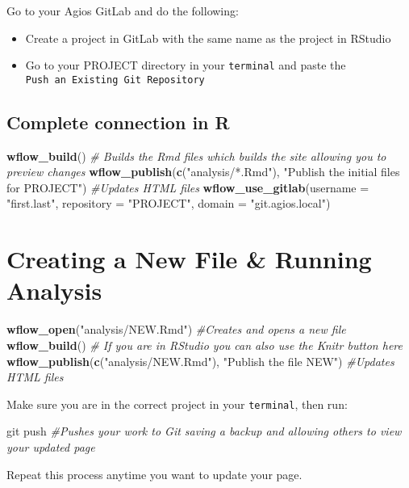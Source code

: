\documentclass[openany]{article}
\newenvironment{Shaded}{\begin{snugshade}}{\end{snugshade}}
\newcommand{\CommentTok}[1]{\textcolor[rgb]{0.56,0.35,0.01}{\textit{#1}}}
\newcommand{\DataTypeTok}[1]{\textcolor[rgb]{0.13,0.29,0.53}{#1}}
\newcommand{\KeywordTok}[1]{\textcolor[rgb]{0.13,0.29,0.53}{\textbf{#1}}}
\newcommand{\NormalTok}[1]{#1}
\newcommand{\StringTok}[1]{\textcolor[rgb]{0.31,0.60,0.02}{#1}}
\providecommand{\tightlist}{%
  \setlength{\itemsep}{0pt}\setlength{\parskip}{0pt}}
\begin{document}
Go to your Agios GitLab and do the following:

\begin{itemize}
\tightlist
\item
  Create a project in GitLab with the same name as the project in RStudio
\item
  Go to your PROJECT directory in your \texttt{terminal} and paste the \texttt{Push\ an\ Existing\ Git\ Repository}
\end{itemize}

\hypertarget{complete-connection-in-r}{%
\subsection{Complete connection in R}\label{complete-connection-in-r}}

\begin{Shaded}
\begin{Highlighting}[]
\KeywordTok{wflow_build}\NormalTok{() }\CommentTok{# Builds the Rmd files which builds the site allowing you to preview changes}
\KeywordTok{wflow_publish}\NormalTok{(}\KeywordTok{c}\NormalTok{(}\StringTok{"analysis/*.Rmd"}\NormalTok{), }\StringTok{"Publish the initial files for PROJECT"}\NormalTok{) }\CommentTok{#Updates HTML files}
\KeywordTok{wflow_use_gitlab}\NormalTok{(}\DataTypeTok{username =} \StringTok{"first.last"}\NormalTok{, }\DataTypeTok{repository =} \StringTok{"PROJECT"}\NormalTok{, }\DataTypeTok{domain =} \StringTok{"git.agios.local"}\NormalTok{)}
\end{Highlighting}
\end{Shaded}

\hypertarget{creating-a-new-file-running-analysis}{%
\section{Creating a New File \& Running Analysis}\label{creating-a-new-file-running-analysis}}

\begin{Shaded}
\begin{Highlighting}[]
\KeywordTok{wflow_open}\NormalTok{(}\StringTok{"analysis/NEW.Rmd"}\NormalTok{) }\CommentTok{#Creates and opens a new file}
\KeywordTok{wflow_build}\NormalTok{() }\CommentTok{# If you are in RStudio you can also use the Knitr button here}
\KeywordTok{wflow_publish}\NormalTok{(}\KeywordTok{c}\NormalTok{(}\StringTok{"analysis/NEW.Rmd"}\NormalTok{), }\StringTok{"Publish the file NEW"}\NormalTok{) }\CommentTok{#Updates HTML files}
\end{Highlighting}
\end{Shaded}

Make sure you are in the correct project in your \texttt{terminal}, then run:

\begin{Shaded}
\begin{Highlighting}[]
\NormalTok{git push }\CommentTok{#Pushes your work to Git saving a backup and allowing others to view your updated page}
\end{Highlighting}
\end{Shaded}

Repeat this process anytime you want to update your page.


\end{document}
